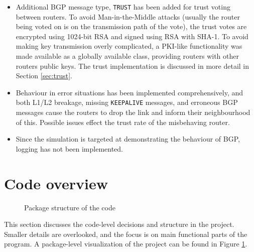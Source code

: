 \documentclass[11pt,a4paper,titlepage]{report}
\begin{document}
\begin{itemize}
\item Additional BGP message type, \texttt{TRUST} has been added for trust voting between routers. To avoid Man-in-the-Middle attacks (usually the router being voted on is on the transmission path of the vote), the trust votes are encrypted using 1024-bit RSA and signed using RSA with SHA-1. To avoid making key transmission overly complicated, a PKI-like functionality was made available as a globally available class, providing routers with other routers public keys. The trust implementation is discussed in more detail in Section \ref{sec:trust}.
\item Behaviour in error situations has been implemented comprehensively, and both L1/L2 breakage, missing \texttt{KEEPALIVE} messages, and erroneous BGP messages cause the routers to drop the link and inform their neighbourhood of this. Possible issues effect the trust rate of the misbehaving router.
\item Since the simulation is targeted at demonstrating the behaviour of BGP, logging has not been implemented.
\end{itemize}

\section{Code overview}\label{sec:hlo}

\begin{figure}
\caption{Package structure of the code}
\label{fig:packagestructure}
\end{figure}

This section discusses the code-level decisions and structure in the project. Smaller details are overlooked, and the focus is on main functional parts of the program. A package-level visualization of the project can be found in Figure \ref{fig:packagestructure}.
\end{document}

